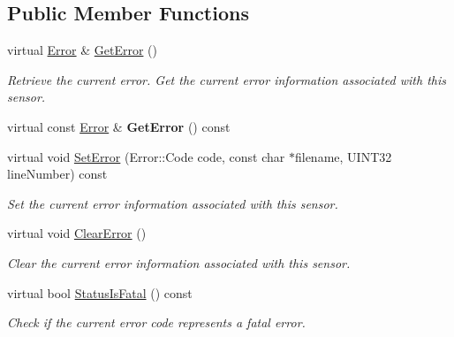 \subsection*{\-Public \-Member \-Functions}
\begin{DoxyCompactItemize}
\item 
\hypertarget{classErrorBase_a2b5460a3e693a12b3023b096795f28cb}{virtual \hyperlink{classError}{\-Error} \& \hyperlink{classErrorBase_a2b5460a3e693a12b3023b096795f28cb}{\-Get\-Error} ()}\label{classErrorBase_a2b5460a3e693a12b3023b096795f28cb}

\begin{DoxyCompactList}\small\item\em \-Retrieve the current error. \-Get the current error information associated with this sensor. \end{DoxyCompactList}\item 
\hypertarget{classErrorBase_aa365da53118bb3cd6c1fd4c42e6d90a3}{virtual const \hyperlink{classError}{\-Error} \& {\bfseries \-Get\-Error} () const }\label{classErrorBase_aa365da53118bb3cd6c1fd4c42e6d90a3}

\item 
virtual void \hyperlink{classErrorBase_aa2f089952c538a73d3e65a6a0bdb09ea}{\-Set\-Error} (\-Error\-::\-Code code, const char $\ast$filename, \-U\-I\-N\-T32 line\-Number) const 
\begin{DoxyCompactList}\small\item\em \-Set the current error information associated with this sensor. \end{DoxyCompactList}\item 
\hypertarget{classErrorBase_a25741ec13e810e708e337b9a26eff477}{virtual void \hyperlink{classErrorBase_a25741ec13e810e708e337b9a26eff477}{\-Clear\-Error} ()}\label{classErrorBase_a25741ec13e810e708e337b9a26eff477}

\begin{DoxyCompactList}\small\item\em \-Clear the current error information associated with this sensor. \end{DoxyCompactList}\item 
virtual bool \hyperlink{classErrorBase_a05790f219c9e436a09752f73f7344024}{\-Status\-Is\-Fatal} () const 
\begin{DoxyCompactList}\small\item\em \-Check if the current error code represents a fatal error. \end{DoxyCompactList}\end{DoxyCompactItemize}
